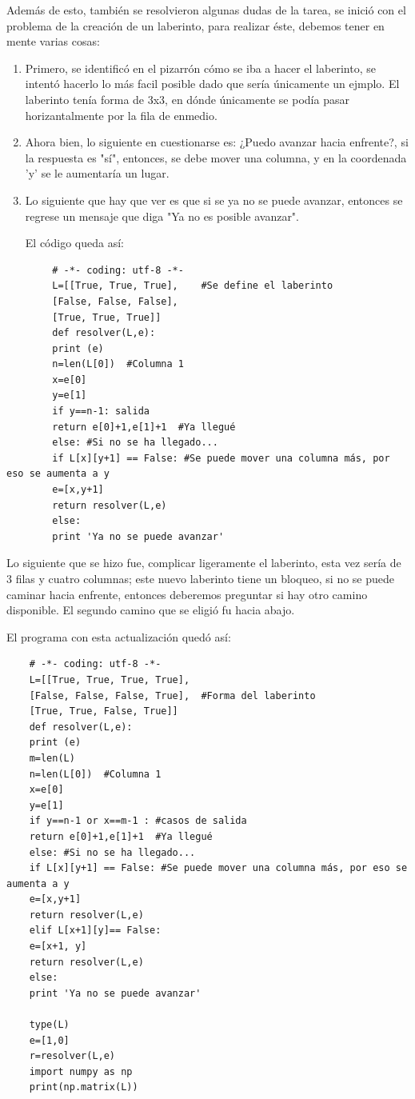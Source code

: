 \documentclass{article}
\begin{document}
	Además de esto, también se resolvieron algunas dudas de la tarea, se inició con el problema de la creación de un laberinto, para realizar éste, debemos tener en mente varias cosas:
	\begin{enumerate}
		\item 
	Primero, se identificó en el pizarrón cómo se iba a hacer el laberinto, se intentó hacerlo lo más facil posible dado que sería únicamente un ejmplo. El laberinto tenía forma de 3x3, en dónde únicamente se podía pasar horizantalmente por la fila de enmedio.
		\item 
	Ahora bien, lo siguiente en cuestionarse es: ¿Puedo avanzar hacia enfrente?, si la respuesta es "sí", entonces, se debe mover una columna, y en la coordenada 'y' se le aumentaría un lugar.
		\item 
	Lo siguiente que hay que ver es que si se ya no se puede avanzar, entonces se regrese un mensaje que diga "Ya no es posible avanzar".
	
	El código queda así:
	\end{enumerate}
	\begin{verbatim}
		# -*- coding: utf-8 -*-
		L=[[True, True, True],    #Se define el laberinto
		[False, False, False],
		[True, True, True]]
		def resolver(L,e):
		print (e)
		n=len(L[0])  #Columna 1
		x=e[0]
		y=e[1]
		if y==n-1: salida
		return e[0]+1,e[1]+1  #Ya llegué
		else: #Si no se ha llegado...
		if L[x][y+1] == False: #Se puede mover una columna más, por eso se aumenta a y 
		e=[x,y+1]
		return resolver(L,e)
		else:
		print 'Ya no se puede avanzar'
	\end{verbatim}
	
	Lo siguiente que se hizo fue, complicar ligeramente el laberinto, esta vez sería de 3 filas y cuatro columnas; este nuevo laberinto tiene un bloqueo, si no se puede caminar hacia enfrente, entonces deberemos preguntar si hay otro camino disponible. El segundo camino que se eligió fu hacia abajo.
	
	El programa con esta actualización quedó así:
	\begin{verbatim}
	# -*- coding: utf-8 -*-
	L=[[True, True, True, True],
	[False, False, False, True],  #Forma del laberinto
	[True, True, False, True]]
	def resolver(L,e):
	print (e)
	m=len(L)
	n=len(L[0])  #Columna 1
	x=e[0]
	y=e[1]
	if y==n-1 or x==m-1 : #casos de salida
	return e[0]+1,e[1]+1  #Ya llegué
	else: #Si no se ha llegado...
	if L[x][y+1] == False: #Se puede mover una columna más, por eso se aumenta a y 
	e=[x,y+1]
	return resolver(L,e)
	elif L[x+1][y]== False:
	e=[x+1, y]
	return resolver(L,e)
	else:
	print 'Ya no se puede avanzar'
	
	type(L)
	e=[1,0]
	r=resolver(L,e)
	import numpy as np
	print(np.matrix(L))
	\end{verbatim}
	
\end{document}
